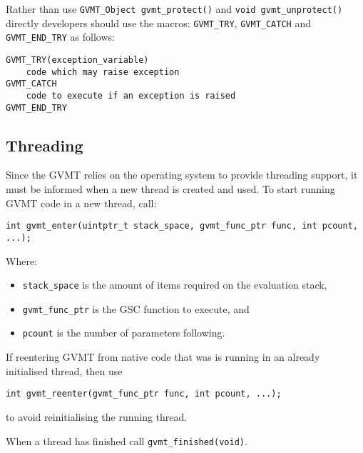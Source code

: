 Rather than use \verb|GVMT_Object gvmt_protect()| and \verb|void gvmt_unprotect()| directly developers should use the macros: 
\verb|GVMT_TRY|, \verb|GVMT_CATCH| and \verb|GVMT_END_TRY| as follows:
\begin{verbatim}
GVMT_TRY(exception_variable)
    code which may raise exception
GVMT_CATCH
    code to execute if an exception is raised
GVMT_END_TRY
\end{verbatim}

\subsection{Threading\label{sect:user-threads}}
Since the GVMT relies on the operating system to provide threading support, it must be informed when a new thread is created and used.
To start running GVMT code in a new thread, call:
\begin{verbatim}
int gvmt_enter(uintptr_t stack_space, gvmt_func_ptr func, int pcount, ...);
\end{verbatim}
Where:
\begin{itemize}
\item \verb|stack_space| is the amount of items required on the evaluation stack,
\item \verb|gvmt_func_ptr| is the GSC function to execute, and
\item \verb|pcount| is the number of parameters following.
\end{itemize}

If reentering GVMT from native code that was is running in an already initialised thread, then use 
\begin{verbatim}
int gvmt_reenter(gvmt_func_ptr func, int pcount, ...);
\end{verbatim}
to avoid reinitialising the running thread.

When a thread has finished call \verb|gvmt_finished(void)|.